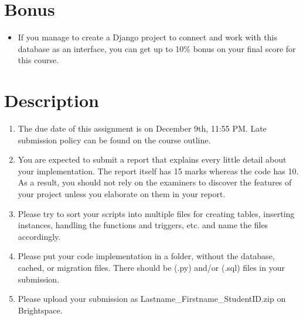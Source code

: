 \documentclass{homework}
\begin{document}
    \section*{Bonus}
    \begin{itemize}
    \item If you manage to create a Django project to connect and work with this database as an interface, you can get up to 10\% bonus on your final score for this course. 
    \end{itemize}
    
    \section*{Description}
\begin{enumerate}
    \item The due date of this assignment is on December 9th, 11:55 PM. Late submission policy can be found on the course outline.
    \item You are expected to submit a report that explains every little detail about your implementation.
    The report itself has 15 marks whereas the code has 10. As a result, you should not rely on the examiners to discover the features of your project unless you elaborate on them in your report.
    \item Please try to sort your scripts into multiple files for creating tables, inserting instances, handling the functions and triggers, etc. and name the files accordingly.
    \item Please put your code implementation in a folder, without the database, cached, or migration files. There should be (.py) and/or (.sql) files in your submission.
    \item Please upload your submission as Lastname\_Firstname\_StudentID.zip on Brightspace.
\end{enumerate}
\end{document}
